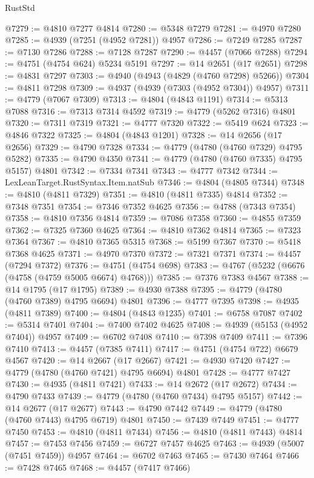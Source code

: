 \begin{lexlean}{RustStd}
\begin{coremodule}
@7279 := @4810 @7277 @4814
@7280 := @5348 @7279
@7281 := @4970 @7280
@7285 := @4939 (@7251 (@4952 @7281)) @4957
@7286 := @7249 @7285
@7287 := @7130 @7286
@7288 := @7128 @7287
@7290 := @4457 (@7066 @7288)
@7294 := @4751 (@4754 @624) @5234 @5191
@7297 := @14 @2651 (@17 @2651)
@7298 := @4831 @7297
@7303 := @4940 (@4943 (@4829 (@4760 @7298) @5266))
@7304 := @4811 @7298
@7309 := @4937 (@4939 (@7303 (@4952 @7304)) @4957)
@7311 := @4779 (@7067 @7309)
@7313 := @4804 (@4843 @1191)
@7314 := @5313 @7088
@7316 := @7313 @7314 @4592
@7319 := @4779 (@5262 @7316) @4801
@7320 := @7311 @7319
@7321 := @4777 @7320
@7322 := @5419 @624
@7323 := @4846 @7322
@7325 := @4804 (@4843 @1201)
@7328 := @14 @2656 (@17 @2656)
@7329 := @4790 @7328
@7334 := @4779 (@4780 (@4760 @7329) @4795 @5282)
@7335 := @4790 @4350
@7341 := @4779 (@4780 (@4760 @7335) @4795 @5157) @4801
@7342 := @7334 @7341
@7343 := @4777 @7342
@7344 := LexLeanTarget.RustSyntax.Item.natSub
@7346 := @4804 (@4805 @7344)
@7348 := @4810 (@4811 @7329)
@7351 := @4810 (@4811 @7335) @4814
@7352 := @7348 @7351
@7354 := @7346 @7352 @4625
@7356 := @4788 (@7343 @7354)
@7358 := @4810 @7356 @4814
@7359 := @7086 @7358
@7360 := @4855 @7359
@7362 := @7325 @7360 @4625
@7364 := @4810 @7362 @4814
@7365 := @7323 @7364
@7367 := @4810 @7365 @5315
@7368 := @5199 @7367
@7370 := @5418 @7368 @4625
@7371 := @4970 @7370
@7372 := @7321 @7371
@7374 := @4457 (@7294 @7372)
@7376 := @4751 (@4754 @698)
@7383 := @4767 (@5232 (@6676 (@4758 (@4759 @5005 @6674) @4768)))
@7385 := @7376 @7383 @4567
@7388 := @14 @1795 (@17 @1795)
@7389 := @4930 @7388
@7395 := @4779 (@4780 (@4760 @7389) @4795 @6694) @4801
@7396 := @4777 @7395
@7398 := @4935 (@4811 @7389)
@7400 := @4804 (@4843 @1235)
@7401 := @6758 @7087
@7402 := @5314 @7401
@7404 := @7400 @7402 @4625
@7408 := @4939 (@5153 (@4952 @7404)) @4957
@7409 := @6702 @7408
@7410 := @7398 @7409
@7411 := @7396 @7410
@7413 := @4457 (@7385 @7411)
@7417 := @4751 (@4754 @722) @6679 @4567
@7420 := @14 @2667 (@17 @2667)
@7421 := @4930 @7420
@7427 := @4779 (@4780 (@4760 @7421) @4795 @6694) @4801
@7428 := @4777 @7427
@7430 := @4935 (@4811 @7421)
@7433 := @14 @2672 (@17 @2672)
@7434 := @4790 @7433
@7439 := @4779 (@4780 (@4760 @7434) @4795 @5157)
@7442 := @14 @2677 (@17 @2677)
@7443 := @4790 @7442
@7449 := @4779 (@4780 (@4760 @7443) @4795 @6719) @4801
@7450 := @7439 @7449
@7451 := @4777 @7450
@7453 := @4810 (@4811 @7434)
@7456 := @4810 (@4811 @7443) @4814
@7457 := @7453 @7456
@7459 := @6727 @7457 @4625
@7463 := @4939 (@5007 (@7451 @7459)) @4957
@7464 := @6702 @7463
@7465 := @7430 @7464
@7466 := @7428 @7465
@7468 := @4457 (@7417 @7466)

\end{coremodule}
\end{lexlean}
